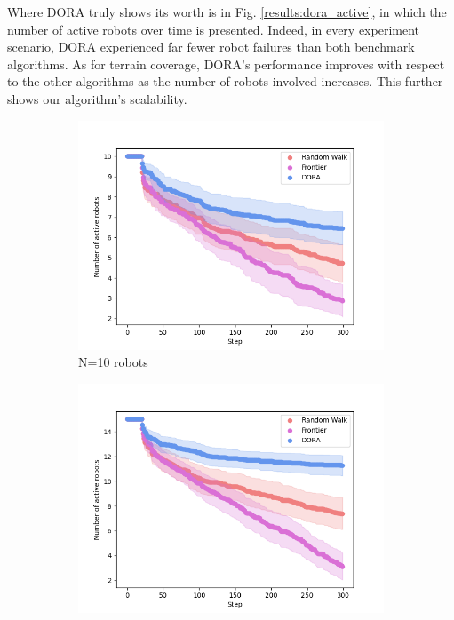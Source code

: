 Where \ac{DORA} truly shows its worth is in Fig. \ref{results:dora_active}, in which the number of active robots over time is presented. Indeed, in every experiment scenario, \ac{DORA} experienced far fewer robot failures than both benchmark algorithms. As for terrain coverage, \ac{DORA}'s performance improves with respect to the other algorithms as the number of robots involved increases. This further shows our algorithm's scalability.

\begin{figure}
    \centering
    \begin{subfigure}{0.45\textwidth}
        \includegraphics[width=\textwidth]{figures/dora_explorer/activerobots_10.png}
        \caption{N=10 robots}
        \label{results:failures10}
    \end{subfigure}
    \begin{subfigure}{0.45\textwidth}
        \includegraphics[width=\textwidth]{figures/dora_explorer/activerobots_15.png}

\end{subfigure}
\end{figure}
